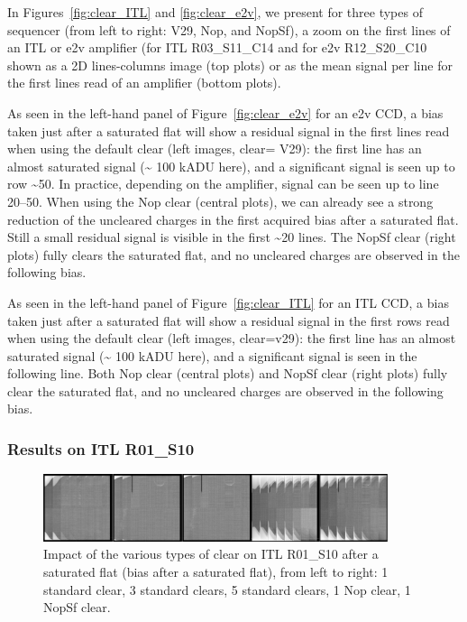 
In Figures~\ref{fig:clear_ITL} and \ref{fig:clear_e2v}, we present for three types of sequencer (from left to
right: V29, Nop, and NopSf), a zoom on the first lines of an ITL or e2v
amplifier (for ITL R03\_S11\_C14 and for e2v
R12\_S20\_C10 shown as a 2D lines-columns
image (top plots) or as the mean signal per line for the first lines
read of an amplifier (bottom plots).

As seen in the left-hand panel of Figure~\ref{fig:clear_e2v}
for an e2v CCD, a bias taken just after a saturated flat will show a
residual signal in the first lines read when using the default clear
(left images, clear= V29): the first line has an almost saturated signal
(\textasciitilde{} 100 kADU here), and a significant signal is seen up
to row \textasciitilde50. In practice, depending on the 
amplifier, signal can be seen up to line 20--50. When using the Nop clear
(central plots), we can already see a strong reduction of the uncleared
charges in the first acquired bias after a saturated flat.  Still a small
residual signal is visible in the first \textasciitilde20 lines. The
NopSf clear (right plots) fully clears the saturated flat, and no
uncleared charges are observed in the following bias.

As seen in the left-hand panel of Figure~\ref{fig:clear_ITL}
for an ITL CCD, a bias taken just after a saturated flat will show a
residual signal in the first rows read when using the default clear
(left images, clear=v29): the first line has an almost saturated signal
(\textasciitilde{} 100 kADU here), and a significant signal is seen in
the following line. Both Nop clear (central plots) and NopSf clear
(right plots) fully clear the saturated flat, and no uncleared charges
are observed in the following bias.

\subsubsection{Results on ITL R01\_S10}\label{results-on-itl-r01s10}

\begin{figure}
\begin{centering}
\includegraphics[width=0.9\textwidth]{sections/figures/Clear_R01_S10.png}
\end{centering}
\caption{Impact of the various types of clear on ITL
R01\_S10 after a saturated flat (bias after a saturated flat), from left
to right: 1 standard clear, 3 standard clears, 5 standard clears, 1 Nop
clear, 1 NopSf clear.}
\label{fig:clears_R01_S10}
\end{figure}


